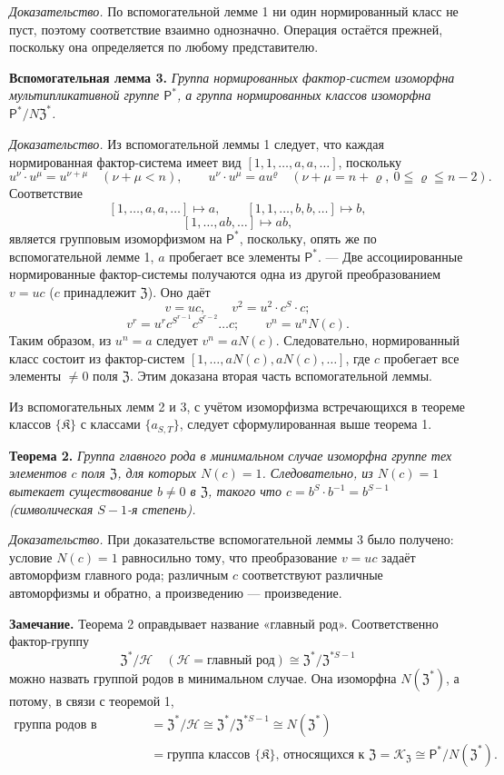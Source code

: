\documentclass[11pt]{article}
\begin{document}
\noindent\emph{Доказательство.} По вспомогательной лемме 1 ни один нормированный класс не пуст, поэтому соответствие взаимно однозначно. Операция остаётся прежней, поскольку она определяется по любому представителю.

\noindent\textbf{Вспомогательная лемма 3.} \emph{Группа нормированных фактор-систем изоморфна мультипликативной группе \(\mathsf{P}^*\), а группа нормированных классов изоморфна \(\mathsf{P}^*/N\mathfrak Z^*\).}

\noindent\emph{Доказательство.} Из вспомогательной леммы 1 следует, что каждая нормированная фактор-система имеет вид \([1,1,\ldots,a,a,\ldots]\), поскольку
\[
u^\nu\cdot u^\mu=u^{\nu+\mu}\quad(\nu+\mu<n),
\qquad
u^\nu\cdot u^\mu=au^\varrho\quad(\nu+\mu=n+\varrho,\ 0\leqq\varrho\leqq n-2).
\]
Соответствие
\[
[1,\ldots,a,a,\ldots]\mapsto a,
\qquad
[1,1,\ldots,b,b,\ldots]\mapsto b,
\]
\[
[1,\ldots,ab,\ldots]\mapsto ab,
\]
является групповым изоморфизмом на \(\mathsf{P}^*\), поскольку, опять же по вспомогательной лемме 1, \(a\) пробегает все элементы \(\mathsf{P}^*\). --- Две ассоциированные нормированные фактор-системы получаются одна из другой преобразованием \(v=uc\) (\(c\) принадлежит \(\mathfrak Z\)). Оно даёт
\[
v=uc,\qquad v^2=u^2\cdot c^S\cdot c;
\]
\[
v^r=u^r c^{S^{r-1}}c^{S^{r-2}}\ldots c;
\qquad
v^n=u^nN(c).
\]
Таким образом, из \(u^n=a\) следует \(v^n=aN(c)\). Следовательно, нормированный класс состоит из фактор-систем \([1,\ldots,aN(c),aN(c),\ldots]\), где \(c\) пробегает все элементы \(\neq0\) поля \(\mathfrak Z\). Этим доказана вторая часть вспомогательной леммы.

Из вспомогательных лемм 2 и 3, с учётом изоморфизма встречающихся в теореме классов \(\{\mathfrak K\}\) с классами \(\{a_{S,T}\}\), следует сформулированная выше теорема 1.

\noindent\textbf{Теорема 2.} \emph{Группа главного рода в минимальном случае изоморфна группе тех элементов \(c\) поля \(\mathfrak Z\), для которых \(N(c)=1\). Следовательно, из \(N(c)=1\) вытекает существование \(b\neq0\) в \(\mathfrak Z\), такого что \(c=b^S\cdot b^{-1}=b^{S-1}\) (символическая \(S-1\)-я степень).}

\noindent\emph{Доказательство.} При доказательстве вспомогательной леммы 3 было получено: условие \(N(c)=1\) равносильно тому, что преобразование \(v=uc\) задаёт автоморфизм главного рода; различным \(c\) соответствуют различные автоморфизмы и обратно, а произведению --- произведение.

\noindent\textbf{Замечание.} Теорема 2 оправдывает название «главный род». Соответственно фактор-группу
\[
\mathfrak Z^*/\mathscr H
\quad(\mathscr H=\text{главный род})
\cong\mathfrak Z^*/\mathfrak Z^{*S-1}
\]
можно назвать группой родов в минимальном случае. Она изоморфна \(N(\mathfrak Z^*)\), а потому, в связи с теоремой 1,
\[
\begin{aligned}
\text{группа родов в минимальном случае}
&=\mathfrak Z^*/\mathscr H
 \cong\mathfrak Z^*/\mathfrak Z^{*S-1}
 \cong N(\mathfrak Z^*)\\
&=\text{группа классов }\{\mathfrak K\}\text{, относящихся к }\mathfrak Z
 =\mathscr K_{\mathfrak Z}
 \cong \mathsf{P}^*/N(\mathfrak Z^*).
\end{aligned}
\]
\end{document}

